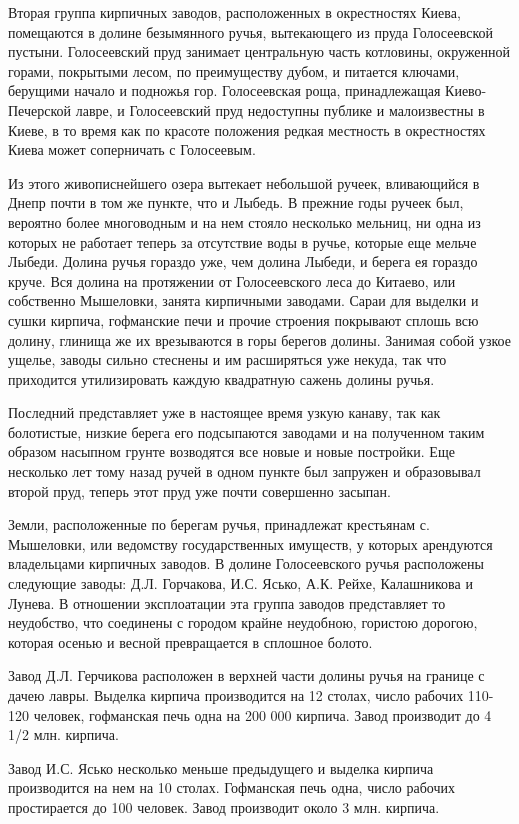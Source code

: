 Вторая группа кирпичных заводов, расположенных в окрестностях Киева, помещаются в долине безымянного ручья, вытекающего из пруда Голосеевской пустыни. Голосеевский пруд занимает центральную часть котловины, окруженной горами, покрытыми лесом, по преимуществу дубом, и питается ключами, берущими начало и подножья гор. Голосеевская роща, принадлежащая Киево-Печерской лавре, и Голосеевский пруд недоступны публике и малоизвестны в Киеве, в то время как по красоте положения редкая местность в окрестностях Киева может соперничать с Голосеевым.

Из этого живописнейшего озера вытекает небольшой ручеек, вливающийся в Днепр почти в том же пункте, что и Лыбедь. В прежние годы ручеек был, вероятно более многоводным и на нем стояло несколько мельниц, ни одна из которых не работает теперь за отсутствие воды в ручье, которые еще мельче Лыбеди. Долина ручья гораздо уже, чем долина Лыбеди, и берега ея гораздо круче. Вся долина на протяжении от Голосеевского леса до Китаево, или собственно Мышеловки, занята кирпичными заводами. Сараи для выделки и сушки кирпича, гофманские печи и прочие строения покрывают сплошь всю долину, глинища же их врезываются в горы берегов долины. Занимая собой узкое ущелье, заводы сильно стеснены и им расширяться уже некуда, так что приходится утилизировать каждую квадратную сажень долины ручья.

Последний представляет уже в настоящее время узкую канаву, так как болотистые, низкие берега его подсыпаются заводами и на полученном таким образом насыпном грунте возводятся все новые и новые постройки. Еще несколько лет тому назад ручей в одном пункте был запружен и образовывал второй пруд, теперь этот пруд уже почти совершенно засыпан.

Земли, расположенные по берегам ручья, принадлежат крестьянам с. Мышеловки, или ведомству государственных имуществ, у которых арендуются владельцами кирпичных заводов. В долине Голосеевского ручья расположены следующие заводы: Д.Л. Горчакова, И.С. Ясько, А.К. Рейхе, Калашникова и Лунева. В отношении эксплоатации эта группа заводов представляет то неудобство, что соединены с городом крайне неудобною, гористою дорогою, которая осенью и весной превращается в сплошное болото.

Завод Д.Л. Герчикова расположен в верхней части долины ручья на границе с дачею лавры. Выделка кирпича производится на 12 столах, число рабочих 110-120 человек, гофманская печь одна на 200 000 кирпича. Завод производит до 4 1/2 млн. кирпича.

Завод И.С. Ясько несколько меньше предыдущего и выделка кирпича производится на нем на 10 столах. Гофманская печь одна, число рабочих простирается до 100 человек. Завод производит около 3 млн. кирпича.


